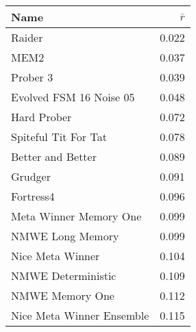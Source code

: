 \begin{tabular}{lr}
\toprule
Name                      &      $\bar{r}$\\
\midrule
Raider                    &      0.022 \\
MEM2                      &      0.037 \\
Prober 3                  &      0.039 \\
Evolved FSM 16 Noise 05   &      0.048 \\
Hard Prober               &      0.072 \\
Spiteful Tit For Tat      &      0.078 \\
Better and Better         &      0.089 \\
Grudger                   &      0.091 \\
Fortress4                 &      0.096 \\
Meta Winner Memory One    &      0.099 \\
NMWE Long Memory          &      0.099 \\
Nice Meta Winner          &      0.104 \\
NMWE Deterministic        &      0.109 \\
NMWE Memory One           &      0.112 \\
Nice Meta Winner Ensemble &      0.115 \\
\bottomrule
\end{tabular}

